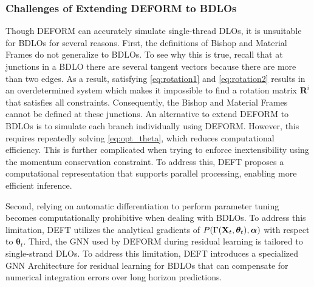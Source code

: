 \subsubsection{Challenges of Extending DEFORM to BDLOs}
Though DEFORM can accurately simulate single-thread DLOs, it is unsuitable for BDLOs for several reasons.
First, the definitions of Bishop and Material Frames do not generalize to BDLOs. 
To see why this is true, recall that at junctions in a BDLO there are several tangent vectors because there are more than two edges. 
As a result, satisfying \eqref{eq:rotation1} and \eqref{eq:rotation2} results in an overdetermined system which makes it impossible to find a rotation matrix $\mathbf{R}^i$ that satisfies all constraints. 
Consequently, the Bishop and Material Frames cannot be defined at these junctions.
An alternative to extend DEFORM to BDLOs is to simulate each branch individually using DEFORM. 
However, this requires repeatedly solving \eqref{eq:opt_theta}, which reduces computational efficiency. 
This is further complicated when trying to enforce inextensibility using the momentum conservation constraint. 
To address this, DEFT proposes a computational representation that supports parallel processing, enabling more efficient inference.

Second, relying on automatic differentiation to perform parameter tuning becomes computationally prohibitive when dealing with BDLOs.
To address this limitation, DEFT utilizes the analytical gradients of $P(\Gamma(\mathbf{X}_t, \bm{\theta}_t), \bm{\alpha})$ with respect to $\bm{\theta}_t$.
Third, the GNN used by DEFORM during residual learning is tailored to single-strand DLOs. 
To address this limitation, DEFT introduces a specialized GNN Architecture for residual learning for BDLOs that can compensate for numerical integration errors over long horizon predictions. 

 